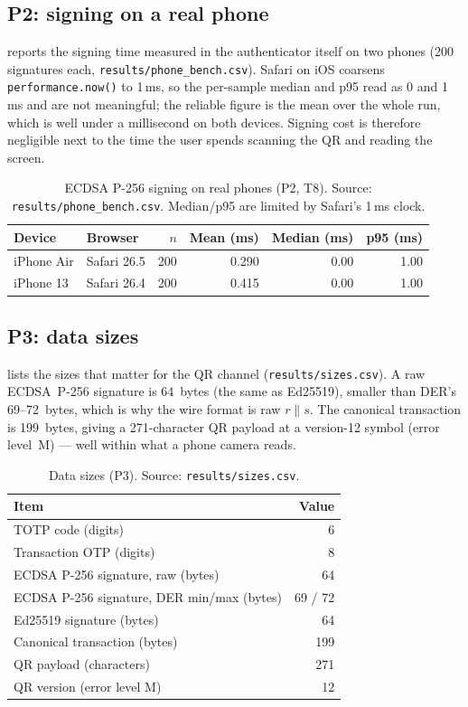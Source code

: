 \subsection{P2: signing on a real phone}
 reports the signing time measured in the authenticator itself on
two phones (200 signatures each, \texttt{results/phone\_bench.csv}). Safari on
iOS coarsens \texttt{performance.now()} to 1\,ms, so the per-sample median and
p95 read as 0 and 1\,ms and are not meaningful; the reliable figure is the mean
over the whole run, which is well under a millisecond on both devices. Signing
cost is therefore negligible next to the time the user spends scanning the QR and
reading the screen.

\begin{table}[htbp]
\centering
\caption{ECDSA P-256 signing on real phones (P2, T8). Source:
\texttt{results/phone\_bench.csv}. Median/p95 are limited by Safari's 1\,ms clock.}
\label{tab:phone}
\small
\begin{tabular}{@{}llrrrr@{}}
\toprule
Device & Browser & $n$ & Mean (ms) & Median (ms) & p95 (ms) \\
\midrule
iPhone Air & Safari 26.5 & 200 & 0.290 & 0.00 & 1.00 \\
iPhone 13  & Safari 26.4 & 200 & 0.415 & 0.00 & 1.00 \\
\bottomrule
\end{tabular}
\end{table}

\subsection{P3: data sizes}
 lists the sizes that matter for the QR channel
(\texttt{results/sizes.csv}). A raw ECDSA~P-256 signature is 64~bytes (the same as
Ed25519), smaller than DER's 69--72~bytes, which is why the wire format is raw
$r\|s$. The canonical transaction is 199~bytes, giving a 271-character QR payload
at a version-12 symbol (error level~M) --- well within what a phone camera reads.

\begin{table}[htbp]
\centering
\caption{Data sizes (P3). Source: \texttt{results/sizes.csv}.}
\label{tab:sizes}
\small
\begin{tabular}{@{}lr@{}}
\toprule
Item & Value \\
\midrule
TOTP code (digits)                       & 6 \\
Transaction OTP (digits)                 & 8 \\
ECDSA P-256 signature, raw (bytes)       & 64 \\
ECDSA P-256 signature, DER min/max (bytes)& 69 / 72 \\
Ed25519 signature (bytes)                & 64 \\
Canonical transaction (bytes)            & 199 \\
QR payload (characters)                  & 271 \\
QR version (error level M)               & 12 \\
\bottomrule
\end{tabular}
\end{table}

